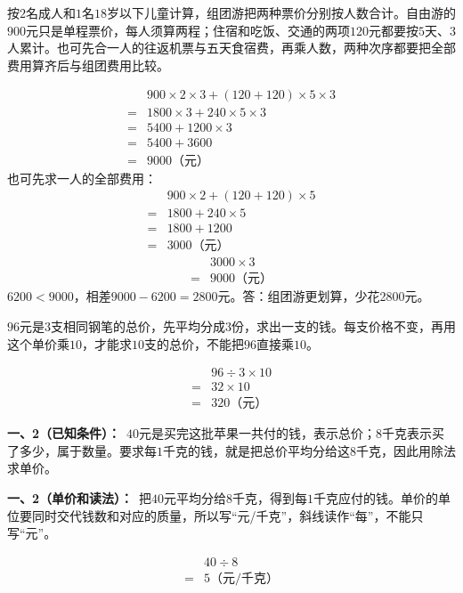 \documentclass[multi=snippet,border=0pt]{standalone}
\newenvironment{snippet}[3]{\begin{minipage}{#1bp}\color{answerred}\fontsize{#2}{#3}\selectfont\raggedright}{\end{minipage}}
\begin{document}
\begin{snippet}{505}{11.5}{14}按\(2\)名成人和\(1\)名\(18\)岁以下儿童计算，组团游把两种票价分别按人数合计。自由游的\(900\)元只是单程票价，每人须算两程；住宿和吃饭、交通的两项\(120\)元都要按\(5\)天、\(3\)人累计。也可先合一人的往返机票与五天食宿费，再乘人数，两种次序都要把全部费用算齐后与组团费用比较。\par \[\begin{aligned}&900\times2\times3+(120+120)\times5\times3\\={}&1800\times3+240\times5\times3\\={}&5400+1200\times3\\={}&5400+3600\\={}&9000\text{（元）}\end{aligned}\]也可先求一人的全部费用：\[\begin{aligned}&900\times2+(120+120)\times5\\={}&1800+240\times5\\={}&1800+1200\\={}&3000\text{（元）}\end{aligned}\]\[\begin{aligned}&3000\times3\\={}&9000\text{（元）}\end{aligned}\]\(6200<9000\)，相差\(9000-6200=2800\)元。答：组团游更划算，少花2800元。\end{snippet}
\begin{snippet}{505}{11.5}{14}\(96\)元是\(3\)支相同钢笔的总价，先平均分成\(3\)份，求出一支的钱。每支价格不变，再用这个单价乘\(10\)，才能求\(10\)支的总价，不能把\(96\)直接乘\(10\)。\par \[\begin{aligned}&96\div3\times10\\={}&32\times10\\={}&320\text{（元）}\end{aligned}\]\end{snippet}
\begin{snippet}{505}{11.5}{14}\textbf{一、2（已知条件）：}\ \(40\)元是买完这批苹果一共付的钱，表示总价；\(8\)千克表示买了多少，属于数量。要求每\(1\)千克的钱，就是把总价平均分给这\(8\)千克，因此用除法求单价。\end{snippet}
\begin{snippet}{505}{11.5}{14}\textbf{一、2（单价和读法）：}\ 把\(40\)元平均分给\(8\)千克，得到每\(1\)千克应付的钱。单价的单位要同时交代钱数和对应的质量，所以写“元/千克”，斜线读作“每”，不能只写“元”。\par \[\begin{aligned}&40\div8\\={}&5\text{（元/千克）}\end{aligned}\]\end{snippet}
\end{document}
